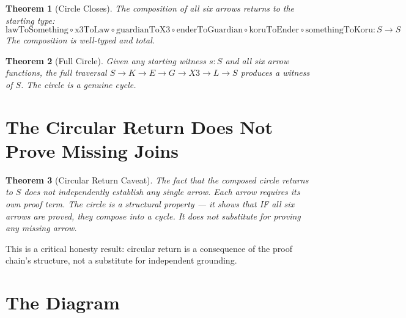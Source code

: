 \documentclass[12pt,a4paper]{article}
\newtheorem{theorem}{Theorem}[section]
\begin{document}
\begin{theorem}[Circle Closes]\label{thm:circle}
The composition of all six arrows returns to the starting type:
\[
\text{lawToSomething} \circ \text{x3ToLaw} \circ \text{guardianToX3}
\circ \text{enderToGuardian} \circ \text{koruToEnder}
\circ \text{somethingToKoru} : S \to S
\]
The composition is well-typed and total.
\end{theorem}

\begin{theorem}[Full Circle]\label{thm:full}
Given any starting witness $s : S$ and all six arrow functions, the
full traversal $S \to K \to E \to G \to X3 \to L \to S$ produces
a witness of $S$. The circle is a genuine cycle.
\end{theorem}

\section{The Circular Return Does Not Prove Missing Joins}

\begin{theorem}[Circular Return Caveat]\label{thm:caveat}
The fact that the composed circle returns to $S$ does not independently
establish any single arrow. Each arrow requires its own proof term.
The circle is a structural property --- it shows that IF all six arrows
are proved, they compose into a cycle. It does not substitute for
proving any missing arrow.
\end{theorem}

This is a critical honesty result: circular return is a consequence of
the proof chain's structure, not a substitute for independent grounding.

\section{The Diagram}

\begin{center}
\end{center}
\end{document}
